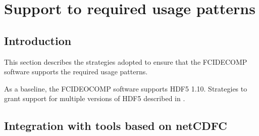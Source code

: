\documentclass[a4paper,10pt,english]{sphinxmanual}
\begin{document}
\chapter{Support to required usage patterns}
\label{\detokenize{support_to_usage_patterns:support-to-required-usage-patterns}}\label{\detokenize{support_to_usage_patterns::doc}}
\sphinxAtStartPar
{}


\section{Introduction}
\label{\detokenize{support_to_usage_patterns:introduction}}
\sphinxAtStartPar
This section describes the strategies adopted to ensure that the FCIDECOMP software supports the required usage
patterns.

\sphinxAtStartPar
{}

\sphinxAtStartPar
As a baseline, the FCIDEOCOMP software supports HDF5 1.10. Strategies to grant support for multiple versions of HDF5
described in {\hyperref[\detokenize{a_further_developments:further-developments}]{}}.


\section{Integration with tools based on netCDF\sphinxhyphen{}C}
\label{\detokenize{support_to_usage_patterns:integration-with-tools-based-on-netcdf-c}}\label{\detokenize{support_to_usage_patterns:integration-with-netcdf-c}}
\sphinxAtStartPar
{}
\end{document}
